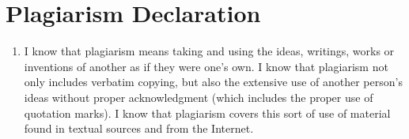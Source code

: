 \section{Plagiarism Declaration}

	\begin{enumerate}
	
	\item
	
	I know that plagiarism means taking and using the ideas, writings, works
	or inventions of another as if they were one’s own. I know that plagiarism
	not only includes verbatim copying, but also the extensive use of another
	person’s ideas without proper acknowledgment (which includes the proper
	use of quotation marks). I know that plagiarism covers this sort of use of
	material found in textual sources and from the Internet.
	
	\end{enumerate}
